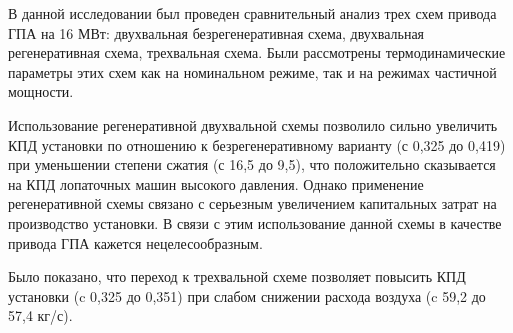 В данной исследовании был проведен сравнительный анализ трех схем привода ГПА на 16 МВт: двухвальная безрегенеративная схема, двухвальная регенеративная схема, трехвальная схема. Были рассмотрены термодинамические параметры этих схем как на номинальном режиме, так и на режимах частичной мощности.

Использование регенеративной двухвальной схемы позволило сильно увеличить КПД установки по отношению к безрегенеративному варианту (с 0,325 до 0,419) при уменьшении степени сжатия (с 16,5 до 9,5), что положительно сказывается на КПД лопаточных машин высокого давления. Однако применение регенеративной схемы связано с серьезным увеличением капитальных затрат на производство установки. В связи с этим использование данной схемы в качестве привода ГПА кажется нецелесообразным.
 
 Было показано, что переход к трехвальной схеме позволяет повысить КПД установки (c 0,325 до 0,351) при слабом снижении расхода воздуха (c 59,2 до 57,4 кг/с).
